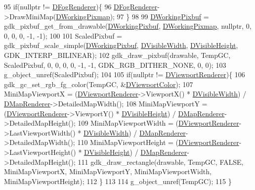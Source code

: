 \begin{DoxyCode}
95     \textcolor{keywordflow}{if}(\textcolor{keyword}{nullptr} != \hyperlink{classCMiniMapRenderer_a51a715ce4773d3fa3f433a282632035c}{DFogRenderer})\{
96         \hyperlink{classCMiniMapRenderer_a51a715ce4773d3fa3f433a282632035c}{DFogRenderer}->DrawMiniMap(\hyperlink{classCMiniMapRenderer_a53bf622d2048ea136ae256e8d4b81fb5}{DWorkingPixmap});
97     \}
98     
99     \hyperlink{classCMiniMapRenderer_ad5f723d83a60882a3e82af72e84ff522}{DWorkingPixbuf} = gdk\_pixbuf\_get\_from\_drawable(\hyperlink{classCMiniMapRenderer_ad5f723d83a60882a3e82af72e84ff522}{DWorkingPixbuf}, 
      \hyperlink{classCMiniMapRenderer_a53bf622d2048ea136ae256e8d4b81fb5}{DWorkingPixmap}, \textcolor{keyword}{nullptr}, 0, 0, 0, 0, -1, -1);
100     
101     ScaledPixbuf = gdk\_pixbuf\_scale\_simple(\hyperlink{classCMiniMapRenderer_ad5f723d83a60882a3e82af72e84ff522}{DWorkingPixbuf}, 
      \hyperlink{classCMiniMapRenderer_aedcb790a697e6f606cd7fa5089a41359}{DVisibleWidth}, \hyperlink{classCMiniMapRenderer_aad56353e51a1a3da66d3428cf0f1ccf8}{DVisibleHeight}, GDK\_INTERP\_BILINEAR);
102     gdk\_draw\_pixbuf(drawable, TempGC, ScaledPixbuf, 0, 0, 0, 0, -1, -1, GDK\_RGB\_DITHER\_NONE, 0, 0);
103     g\_object\_unref(ScaledPixbuf);
104 
105     \textcolor{keywordflow}{if}(\textcolor{keyword}{nullptr} != \hyperlink{classCMiniMapRenderer_a36d2e3446baba2607129c673311d3420}{DViewportRenderer})\{
106         gdk\_gc\_set\_rgb\_fg\_color(TempGC, &\hyperlink{classCMiniMapRenderer_a6a4f56052a4ced356448f5f1cc9a465e}{DViewportColor});
107         MiniMapViewportX = (\hyperlink{classCMiniMapRenderer_a36d2e3446baba2607129c673311d3420}{DViewportRenderer}->ViewportX() * 
      \hyperlink{classCMiniMapRenderer_aedcb790a697e6f606cd7fa5089a41359}{DVisibleWidth}) / \hyperlink{classCMiniMapRenderer_a6656b208c6b29641a151ea4cbcfda31b}{DMapRenderer}->DetailedMapWidth();
108         MiniMapViewportY = (\hyperlink{classCMiniMapRenderer_a36d2e3446baba2607129c673311d3420}{DViewportRenderer}->ViewportY() * 
      \hyperlink{classCMiniMapRenderer_aad56353e51a1a3da66d3428cf0f1ccf8}{DVisibleHeight}) / \hyperlink{classCMiniMapRenderer_a6656b208c6b29641a151ea4cbcfda31b}{DMapRenderer}->DetailedMapHeight();
109         MiniMapViewportWidth = (\hyperlink{classCMiniMapRenderer_a36d2e3446baba2607129c673311d3420}{DViewportRenderer}->LastViewportWidth() * 
      \hyperlink{classCMiniMapRenderer_aedcb790a697e6f606cd7fa5089a41359}{DVisibleWidth}) / \hyperlink{classCMiniMapRenderer_a6656b208c6b29641a151ea4cbcfda31b}{DMapRenderer}->DetailedMapWidth();
110         MiniMapViewportHeight = (\hyperlink{classCMiniMapRenderer_a36d2e3446baba2607129c673311d3420}{DViewportRenderer}->LastViewportHeight() * 
      \hyperlink{classCMiniMapRenderer_aad56353e51a1a3da66d3428cf0f1ccf8}{DVisibleHeight}) / \hyperlink{classCMiniMapRenderer_a6656b208c6b29641a151ea4cbcfda31b}{DMapRenderer}->DetailedMapHeight();
111         gdk\_draw\_rectangle(drawable, TempGC, FALSE, MiniMapViewportX, MiniMapViewportY, 
      MiniMapViewportWidth,  MiniMapViewportHeight);
112     \}
113     
114     g\_object\_unref(TempGC);
115 \}
\end{DoxyCode}
